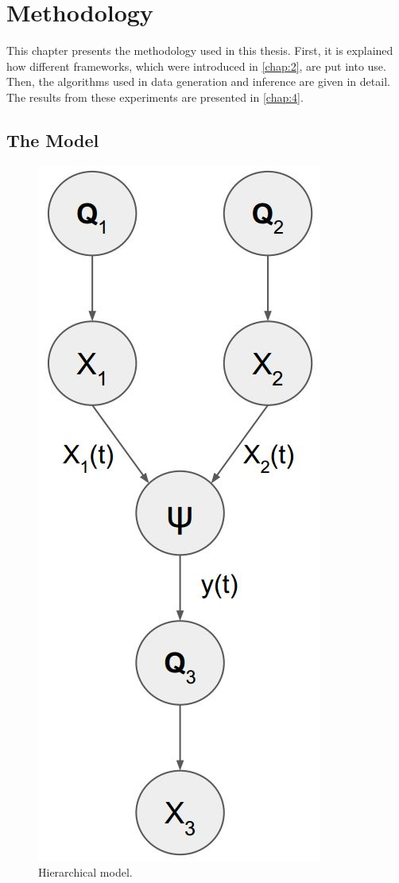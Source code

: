%
\chapter{Methodology}
\label{chap:3}

This chapter presents the methodology used in this thesis. First, it is explained how different frameworks, which were introduced in \cref{chap:2}, are put into use. Then, the algorithms used in data generation and inference are given in detail. The results from these experiments are presented in \cref{chap:4}.

\section{The Model}
\begin{figure}
	\centering
	\includegraphics[width=0.6\linewidth]{figures/h_model}
	\caption{Hierarchical model.}
	\label{fig:h_model}
\end{figure} 
